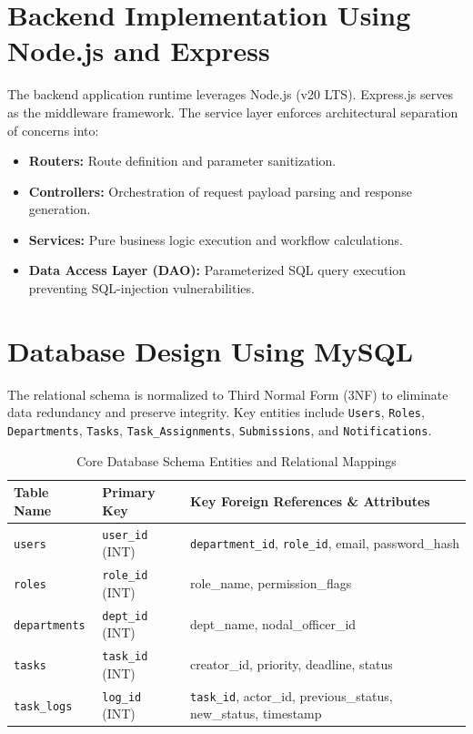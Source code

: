\section{Backend Implementation Using Node.js and Express}
\label{sec:backend_implementation}
The backend application runtime leverages Node.js (v20 LTS). Express.js serves as the middleware framework. The service layer enforces architectural separation of concerns into:
\begin{itemize}
    \item \textbf{Routers:} Route definition and parameter sanitization.
    \item \textbf{Controllers:} Orchestration of request payload parsing and response generation.
    \item \textbf{Services:} Pure business logic execution and workflow calculations.
    \item \textbf{Data Access Layer (DAO):} Parameterized SQL query execution preventing SQL-injection vulnerabilities.
\end{itemize}

\section{Database Design Using MySQL}
\label{sec:database_design}
The relational schema is normalized to Third Normal Form (3NF) to eliminate data redundancy and preserve integrity. Key entities include \texttt{Users}, \texttt{Roles}, \texttt{Departments}, \texttt{Tasks}, \texttt{Task\_Assignments}, \texttt{Submissions}, and \texttt{Notifications}.

\begin{table}[ht]
\centering
\caption{Core Database Schema Entities and Relational Mappings}
\label{tab:db_schema}
\begin{tabularx}{\textwidth}{l l X}
\toprule
\textbf{Table Name} & \textbf{Primary Key} & \textbf{Key Foreign References \& Attributes} \\
\midrule
\texttt{users} & \texttt{user\_id} (INT) & \texttt{department\_id}, \texttt{role\_id}, email, password\_hash \\
\texttt{roles} & \texttt{role\_id} (INT) & role\_name, permission\_flags \\
\texttt{departments} & \texttt{dept\_id} (INT) & dept\_name, nodal\_officer\_id \\
\texttt{tasks} & \texttt{task\_id} (INT) & creator\_id, priority, deadline, status \\
\texttt{task\_logs} & \texttt{log\_id} (INT) & \texttt{task\_id}, actor\_id, previous\_status, new\_status, timestamp \\
\bottomrule
\end{tabularx}
\end{table}

